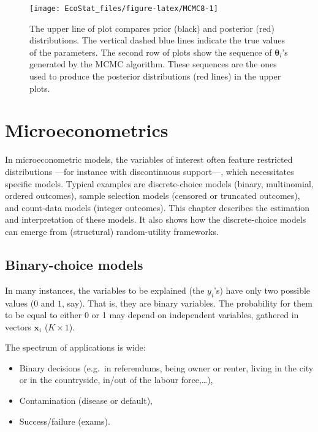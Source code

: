\documentclass[
  12pt,
]{book}
\providecommand{\tightlist}{%
  \setlength{\itemsep}{0pt}\setlength{\parskip}{0pt}}
\theoremstyle{definition}
\theoremstyle{definition}
\theoremstyle{definition}
\theoremstyle{definition}
\theoremstyle{remark}
\begin{document}
\begin{figure}
\texttt{[image: EcoStat\_files/figure-latex/MCMC8-1]} \caption{The upper line of plot compares prior (black) and posterior (red) distributions. The vertical dashed blue lines indicate the true values of the parameters. The second row of plots show the sequence of $\boldsymbol\theta_i$'s generated by the MCMC algorithm. These sequences are the ones used to produce the posterior distributions (red lines) in the upper plots.}\label{fig:MCMC8}
\end{figure}

\hypertarget{microeconometrics}{%
\chapter{Microeconometrics}\label{microeconometrics}}

In microeconometric models, the variables of interest often feature restricted distributions ---for instance with discontinuous support---, which necessitates specific models. Typical examples are discrete-choice models (binary, multinomial, ordered outcomes), sample selection models (censored or truncated outcomes), and count-data models (integer outcomes). This chapter describes the estimation and interpretation of these models. It also shows how the discrete-choice models can emerge from (structural) random-utility frameworks.

\hypertarget{binary-choice-models}{%
\section{Binary-choice models}\label{binary-choice-models}}

In many instances, the variables to be explained (the \(y_i\)'s) have only two possible values (\(0\) and \(1\), say). That is, they are binary variables. The probability for them to be equal to either 0 or 1 may depend on independent variables, gathered in vectors \(\mathbf{x}_i\) (\(K \times 1\)).

The spectrum of applications is wide:

\begin{itemize}
\tightlist
\item
  Binary decisions (e.g.~in referendums, being owner or renter, living in the city or in the countryside, in/out of the labour force,\ldots),
\item
  Contamination (disease or default),
\item
  Success/failure (exams).
\end{itemize}
\end{document}
